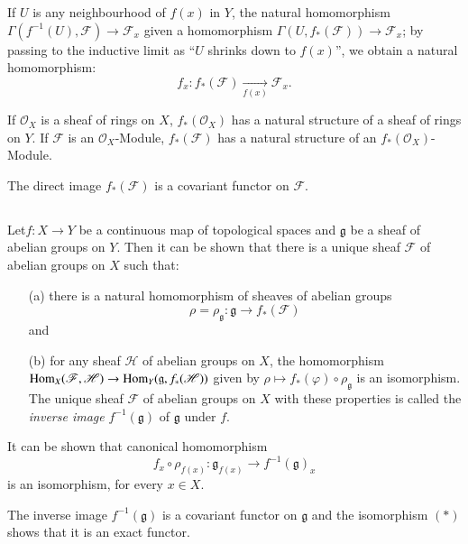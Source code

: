 If $U$ is any neighbourhood of $f(x)$ in $Y$, the natural homomorphism
$\Gamma(f^{-1}(U),\mathscr{F})\to\mathscr{F}_{x}$ given a homomorphism
$\Gamma(U,f_{\ast}(\mathscr{F}))\to \mathscr{F}_{x}$; by passing to
the inductive limit as ``$U$ shrinks down to $f(x)$'', we obtain a
natural homomorphism:
$$
f_{x}:f_{\ast}(\mathscr{F})\xrightarrow[f(x)]{}\mathscr{F}_{x}.
$$

If $\mathscr{O}_{X}$ is a sheaf of rings on $X$,
$f_{\ast}(\mathscr{O}_{X})$ has a natural structure of a sheaf of
rings on $Y$. If $\mathscr{F}$ is an $\mathscr{O}_{X}$-Module,
$f_{\ast}(\mathscr{F})$ has a natural structure of an
$f_{\ast}(\mathscr{O}_{X})$-Module. 

The direct image $f_{\ast}(\mathscr{F})$ is a covariant functor on
$\mathscr{F}$. 

\subsection{}\label{chap1-sec1.5.2}%
Let\pageoriginale $f:X\to Y$ be a continuous map of topological spaces
and $\mathfrak{g}$ be a sheaf of abelian groups on $Y$. Then it can be
shown that there is a unique sheaf $\mathscr{F}$ of abelian groups on
$X$ such that:
\begin{itemize}
\item[(a)] there is a natural homomorphism of sheaves of abelian
  groups
$$
\rho=\rho_{\mathfrak{g}}:\mathfrak{g}\to f_{\ast}(\mathscr{F})
$$
and

\item[(b)] for any sheaf $\mathscr{H}$ of abelian groups on $X$, the
  homomorphism $\operatorname{Hom}_{X}(\mathscr{F},\mathscr{H})\to
  \operatorname{Hom}_{Y}(\mathfrak{g},f_{\ast}(\mathscr{H}))$ given by $\rho\mapsto
  f_{\ast}(\varphi)\circ \rho_{\mathfrak{g}}$ is an isomorphism. The
  unique sheaf $\mathscr{F}$ of abelian groups on $X$ with these
  properties is called the {\em inverse image} $f^{-1}(\mathfrak{g})$
  of $\mathfrak{g}$ under $f$.
\end{itemize}

It can be shown that canonical homomorphism
\begin{equation*}
f_{x}\circ\rho_{f(x)}:\mathfrak{g}_{f(x)}\to f^{-1}(\mathfrak{g})_{x}\tag{*}
\end{equation*}
is an isomorphism, for every $x\in X$.

The inverse image $f^{-1}(\mathfrak{g})$ is a covariant functor on
$\mathfrak{g}$ and the isomorphism $(\ast)$ shows that it is an exact
functor.

